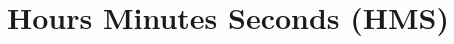 \hypertarget{group___e_g_x_math-_angle_conversions-_h_m_s}{}\section{Hours Minutes Seconds (H\+MS)}
\label{group___e_g_x_math-_angle_conversions-_h_m_s}
